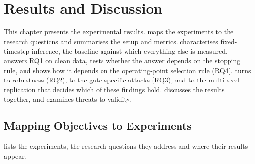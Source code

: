\chapter{Results and Discussion}
\label{ch:results}

This chapter presents the experimental results.  maps the experiments to the research questions and  summarises the setup and metrics.  characterises fixed-timestep inference, the baseline against which everything else is measured.  answers RQ1 on clean data,  tests whether the answer depends on the stopping rule, and  shows how it depends on the operating-point selection rule (RQ4).  turns to robustness (RQ2),  to the gate-specific attacks (RQ3), and  to the multi-seed replication that decides which of these findings hold.  discusses the results together, and  examines threats to validity.

\section{Mapping Objectives to Experiments}
\label{sec:res-map}

 lists the experiments, the research questions they address and where their results appear.

